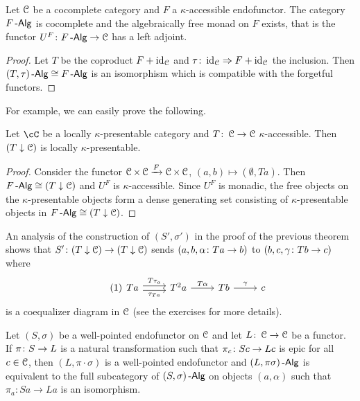 \documentclass[a4paper,11pt,oneside,openany]{scrbook}
\begin{document}
\begin{thm}
	Let $ \operatorname{\mathcal{C}} $ be a cocomplete category and $ F $ a $ \kappa $-accessible
    endofunctor. The category $ F\operatorname{-\mathsf{Alg}} $ is cocomplete and the algebraically free
    monad on $ F $ exists, that is the functor $U^F \colon F\operatorname{-\mathsf{Alg}} \to \operatorname{\mathcal{C}} $ has a
    left adjoint.
\end{thm}
\begin{proof}
	Let $ T $ be the coproduct $ F + \operatorname{id}_{\operatorname{\mathcal{C}}} $ and $ \tau\colon
    \operatorname{id}_{\operatorname{\mathcal{C}}}\Rightarrow F+\operatorname{id}_{\operatorname{\mathcal{C}}} $ the inclusion.	Then $  (T,\tau)\operatorname{-\mathsf{Alg}} \cong
    F\operatorname{-\mathsf{Alg}} $ is an isomorphism which is compatible with the forgetful functors.
\end{proof}

For example, we can easily prove the following.

\begin{prop}
	Let $ \cC $ be a locally $ \kappa $-presentable category and $ T \colon \operatorname{\mathcal{C}}
		\to \operatorname{\mathcal{C}} $ $ \kappa $-accessible. Then $ (T\downarrow\operatorname{\mathcal{C}}) $ is locally $ \kappa
	$-presentable.
\end{prop}
\begin{proof}
	Consider the functor $ \operatorname{\mathcal{C}} \times \operatorname{\mathcal{C}} \xrightarrow{F} \operatorname{\mathcal{C}} \times \operatorname{\mathcal{C}} $, $ (a,b)\mapsto (\emptyset, Ta) $.
	Then $ F\operatorname{-\mathsf{Alg}} \cong (T\downarrow\operatorname{\mathcal{C}}) $ and $ U^F $ is $ \kappa $-accessible.
	Since $ U^F  $ is monadic, the free objects on the $ \kappa $-presentable
    objects form a dense generating set consisting of $ \kappa $-presentable
    objects in $ F\operatorname{-\mathsf{Alg}} \cong (T\downarrow\operatorname{\mathcal{C}}) $.
\end{proof}
\begin{rmk}
	An analysis of the construction of $ (S',\sigma') $ in the proof of the
    previous theorem shows that $ S' \colon (T\downarrow\operatorname{\mathcal{C}}) \to (T\downarrow\operatorname{\mathcal{C}}) $
    sends $ (a,b,\alpha \colon Ta \to b) $ to $ (b,c, \gamma \colon Tb \to c) $
    where
	\begin{displaymath}\tag{1}\label{fork1}
		\begin{tikzcd}
			T a \arrow[r,shift left, "T \tau_a"]\arrow[r,shift right,"\tau_{Ta}"']& T^2 a \arrow[r, "T\alpha" ] & Tb \arrow[r, "\gamma"]  & c
		\end{tikzcd}
	\end{displaymath}
    is a coequalizer diagram in $ \operatorname{\mathcal{C}} $ (see the exercises for more details).
\end{rmk}
\begin{prop}
	Let $(S,\sigma)$ be a well-pointed endofunctor on $\operatorname{\mathcal{C}}$ and let
    $L\colon\operatorname{\mathcal{C}}\to\operatorname{\mathcal{C}}$ be a functor.
	If $\pi\colon S\to L$ is a natural transformation such that $\pi_c\colon
	Sc\to Lc$ is epic for all $c\in\operatorname{\mathcal{C}}$, then $(L,\pi\cdot\sigma) $ is
    a well-pointed endofunctor and $(L,\pi\sigma)\operatorname{-\mathsf{Alg}}$ is equivalent to
    the full subcategory of $(S,\sigma)\operatorname{-\mathsf{Alg}}$ on objects $(a,\alpha)$
    such that $\pi_a\colon Sa\to La$ is an isomorphism.
\end{prop}
\end{document}

